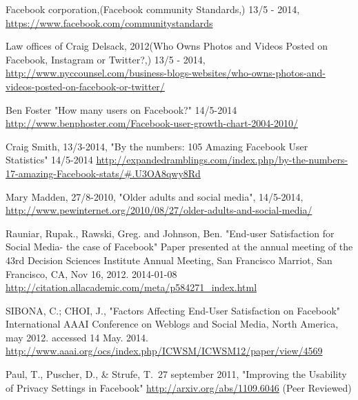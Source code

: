 \documentclass[conference]{IEEEtran}
\begin{document}
\begin{thebibliography}{1}
Facebook corporation,(Facebook community Standards,) 13/5 - 2014, \href{https://www.facebook.com/communitystandards}{https://www.facebook.com/communitystandards}

Law offices of Craig Delsack,
2012(Who Owns Photos and Videos Posted on Facebook, Instagram or Twitter?,) 13/5 - 2014, \href{http://www.nyccounsel.com/business-blogs-websites/who-owns-photos-and-videos-posted-on-facebook-or-twitter/}{http://www.nyccounsel.com/business-blogs-websites/who-owns-photos-and-videos-posted-on-facebook-or-twitter/}




Ben Foster
"How many users on Facebook?"
14/5-2014
\href{http://www.benphoster.com/Facebook-user-growth-chart-2004-2010/}{http://www.benphoster.com/Facebook-user-growth-chart-2004-2010/}

Craig Smith,
13/3-2014,
"By the numbers: 105 Amazing Facebook User Statistics"
14/5-2014
\href{http://expandedramblings.com/index.php/by-the-numbers-17-amazing-Facebook-stats/\#.U3OA8qwy8Rd}{http://expandedramblings.com/index.php/by-the-numbers-17-amazing-Facebook-stats/\#.U3OA8qwy8Rd}

Mary Madden,
27/8-2010,
"Older adults and social media",
14/5-2014,
\href{http://www.pewinternet.org/2010/08/27/older-adults-and-social-media/}{http://www.pewinternet.org/2010/08/27/older-adults-and-social-media/}

Rauniar, Rupak., Rawski, Greg. and Johnson, Ben. "End-user Satisfaction for Social Media- the case of Facebook" Paper presented at the annual meeting of the 43rd Decision Sciences Institute Annual Meeting, San Francisco Marriot, San Francisco, CA, Nov 16, 2012. 2014-01-08 \href{http://citation.allacademic.com/meta/p584271\_index.html}{http://citation.allacademic.com/meta/p584271\_index.html}

SIBONA, C.; CHOI, J., 
"Factors Affecting End-User Satisfaction on Facebook"
International AAAI Conference on Weblogs and Social Media, North America, may 2012.
accessed 14 May. 2014.
\href{http://www.aaai.org/ocs/index.php/ICWSM/ICWSM12/paper/view/4569}{http://www.aaai.org/ocs/index.php/ICWSM/ICWSM12/paper/view/4569}

 Paul, T., Puscher, D., 
\& Strufe, T.\ 27 september 2011,
"Improving the Usability of Privacy Settings in Facebook"
\href{http://arxiv.org/abs/1109.6046}{http://arxiv.org/abs/1109.6046} (Peer Reviewed)


\end{thebibliography}
\end{document}
